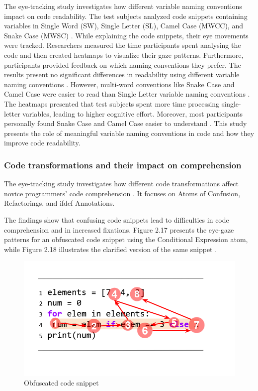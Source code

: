 The eye-tracking study \citet{broberg2019using}investigates how different variable naming conventions impact on code readability.  
The test subjects analyzed code snippets containing variables in Single Word (SW), Single Letter (SL), Camel Case (MWCC), and Snake Case (MWSC) \citet{broberg2019using}. While explaining the code snippets, their eye movements were tracked. Researchers measured the time participants spent analysing the code and then created heatmaps to visualize their gaze patterns. Furthermore, participants provided feedback on which naming conventions they prefer. The results present no significant differences in readability using different variable naming conventions \citet{broberg2019using}. However, multi-word conventions like Snake Case and Camel Case were easier to read than Single Letter variable naming conventions \citet{broberg2019using}. The heatmaps presented that test subjects spent more time processing single-letter variables, leading to higher cognitive effort. Moreover, most participants personally found Snake Case and Camel Case easier to understand \citet{broberg2019using}. 
This study presents the role of meaningful variable naming conventions in code and how they improve code readability.   

\subsubsection{Code transformations and their impact on comprehension}
The eye-tracking study \citet{silva2023evaluating} investigates how different code transformations affect novice programmers’ code comprehension \citet{silva2023evaluating}. It focuses on Atoms of Confusion, Refactorings, and ifdef Annotations. 

The findings show that confusing code snippets lead to difficulties in code comprehension and in increased fixations. Figure 2.17 presents the eye-gaze patterns for an obfuscated code snippet using the Conditional Expression atom, while Figure 2.18 illustrates the clarified version of the same snippet \citet{silva2023evaluating}. 
 

\begin{figure} [H]
  \centering
  \includegraphics[scale=1]{figures/a.png}
  \caption{Obfuscated code snippet \citet{silva2023evaluating}}
  \label{fig:AnhangsChor}
\end{figure}

